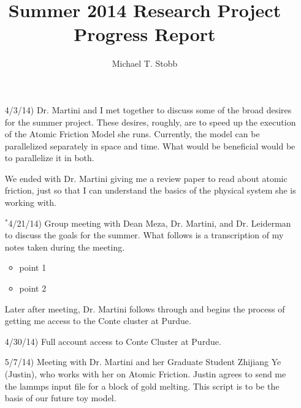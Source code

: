 \documentclass[12pt]{article}
\title{Summer 2014 Research Project \\ Progress Report}
\author{Michael T. Stobb}
\begin{document}

\onehalfspacing

\maketitle

\begin{itemize}




\item[4/3/14)] Dr. Martini and I met together to discuss some of the broad desires for the summer project.  These desires, roughly, are to speed up the execution of the Atomic Friction Model she runs.  Currently, the model can be parallelized separately in space and time.  What would be beneficial would be to parallelize it in both.  

We ended with Dr. Martini giving me a review paper to read about atomic friction, just so that I can understand the basics of the physical system she is working with.


\item[$^*$4/21/14)] Group meeting with Dean Meza, Dr. Martini, and Dr. Leiderman to discuss the goals for the summer.  What follows is a transcription of my notes taken during the meeting.

\begin{itemize}
 \item point 1
 \item point 2
\end{itemize}

Later after meeting, Dr. Martini follows through and begins the process of getting me access to the Conte cluster at Purdue.


\item[4/30/14)] Full account access to Conte Cluster at Purdue.


\item[5/7/14)] Meeting with Dr. Martini and her Graduate Student Zhijiang Ye (Justin), who works with her on Atomic Friction.  Justin agrees to send me the lammps input file for a block of gold melting.  This script is to be the basis of our future toy model.


\end{itemize}
\end{document}

